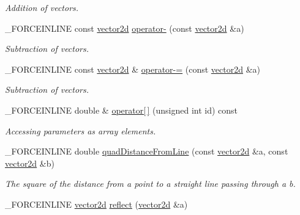 \begin{DoxyCompactItemize}
\begin{DoxyCompactList}\small\item\em Addition of vectors. \end{DoxyCompactList}\item 
\hypertarget{classbt_1_1vector2d_a0eb99908ccc8cd5c4c9406c3ec8f17fb}{\-\_\-\-F\-O\-R\-C\-E\-I\-N\-L\-I\-N\-E const \hyperlink{classbt_1_1vector2d}{vector2d} \hyperlink{classbt_1_1vector2d_a0eb99908ccc8cd5c4c9406c3ec8f17fb}{operator-\/} (const \hyperlink{classbt_1_1vector2d}{vector2d} \&a)}\label{classbt_1_1vector2d_a0eb99908ccc8cd5c4c9406c3ec8f17fb}

\begin{DoxyCompactList}\small\item\em Subtraction of vectors. \end{DoxyCompactList}\item 
\hypertarget{classbt_1_1vector2d_a1045130ad8ff033c6a111a06347142b5}{\-\_\-\-F\-O\-R\-C\-E\-I\-N\-L\-I\-N\-E const \hyperlink{classbt_1_1vector2d}{vector2d} \& \hyperlink{classbt_1_1vector2d_a1045130ad8ff033c6a111a06347142b5}{operator-\/=} (const \hyperlink{classbt_1_1vector2d}{vector2d} \&a)}\label{classbt_1_1vector2d_a1045130ad8ff033c6a111a06347142b5}

\begin{DoxyCompactList}\small\item\em Subtraction of vectors. \end{DoxyCompactList}\item 
\hypertarget{classbt_1_1vector2d_a00cdbc9b13501f9b318b64cd1f5ed13e}{\-\_\-\-F\-O\-R\-C\-E\-I\-N\-L\-I\-N\-E double \& \hyperlink{classbt_1_1vector2d_a00cdbc9b13501f9b318b64cd1f5ed13e}{operator\mbox{[}$\,$\mbox{]}} (unsigned int id) const }\label{classbt_1_1vector2d_a00cdbc9b13501f9b318b64cd1f5ed13e}

\begin{DoxyCompactList}\small\item\em Accessing parameters as array elements. \end{DoxyCompactList}\item 
\hypertarget{classbt_1_1vector2d_a17744ec8e66f80aba16f94671c85bd85}{\-\_\-\-F\-O\-R\-C\-E\-I\-N\-L\-I\-N\-E double \hyperlink{classbt_1_1vector2d_a17744ec8e66f80aba16f94671c85bd85}{quad\-Distance\-From\-Line} (const \hyperlink{classbt_1_1vector2d}{vector2d} \&a, const \hyperlink{classbt_1_1vector2d}{vector2d} \&b)}\label{classbt_1_1vector2d_a17744ec8e66f80aba16f94671c85bd85}

\begin{DoxyCompactList}\small\item\em The square of the distance from a point to a straight line passing through a b. \end{DoxyCompactList}\item 
\hypertarget{classbt_1_1vector2d_a1c38ab17fb3865cd136f0a38b731c856}{\-\_\-\-F\-O\-R\-C\-E\-I\-N\-L\-I\-N\-E \hyperlink{classbt_1_1vector2d}{vector2d} \hyperlink{classbt_1_1vector2d_a1c38ab17fb3865cd136f0a38b731c856}{reflect} (\hyperlink{classbt_1_1vector2d}{vector2d} \&a)}\label{classbt_1_1vector2d_a1c38ab17fb3865cd136f0a38b731c856}


\end{DoxyCompactItemize}
